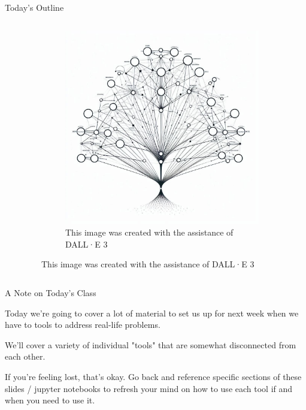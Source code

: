\documentclass[10pt, aspectratio=169]{beamer}
\begin{document}
\begin{frame}{Today's Outline}
\begin{columns}
\begin{column}{0.5\textwidth}
\begin{enumerate}
\begin{itemize}
                \end{itemize}
            \end{enumerate}
        \end{column}
        \begin{column}{0.5\textwidth}
            \begin{figure}
                \begin{figure}
                    \includegraphics[width=0.95\linewidth]{DecisionTree.png}
                    \caption{This image was created with the assistance of DALL·E 3}
                \end{figure}
            \end{figure}
        \end{column}
    \end{columns}
\end{frame}

\begin{frame}{A Note on Today's Class}
    \begin{center}
        Today we're going to cover a lot of material to set us up for next week when we have to tools to address real-life problems.

        \vspace{1cm}

        We'll cover a variety of individual "tools" that are somewhat disconnected from each other.

        \vspace{1cm}

        If you're feeling lost, that's okay. Go back and reference specific sections of these slides / jupyter notebooks to refresh your mind on how to use each tool if and when you need to use it.
    \end{center}
\end{frame}
\end{document}
